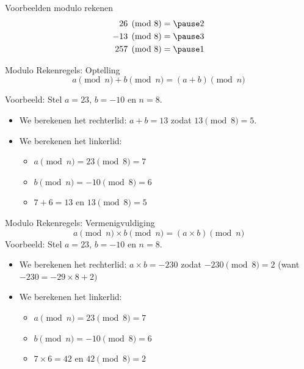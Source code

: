 \documentclass{beamer}
\begin{document}
\begin{frame}{Voorbeelden modulo rekenen}
	\begin{eqnarray*}
			26  \pmod{8} &= \pause 2 \\
			-13 \pmod{8} &= \pause 3 \\
			257 \pmod{8} &= \pause 1 
	\end{eqnarray*}
\end{frame}


\begin{frame}{Modulo Rekenregels: Optelling}
	\[ a \pmod{n} + b \pmod{n}  =  (a + b)  \pmod{n}\]
	
	\vspace{0.5cm}
	Voorbeeld: Stel $a = 23$, $b = -10$ en $n = 8$.
	\begin{itemize}
	\pause \item We berekenen het rechterlid: $a + b = 13$ zodat $13 \pmod 8 = 5$.
	\pause \item We berekenen het linkerlid:
	 \begin{itemize}
	   \pause\item $a \pmod n = 23 \pmod{8} = 7$
	   \pause\item $b \pmod n = -10\pmod{8} = 6$
	   \pause \item $7 + 6 = 13$ en $13 \pmod{8} = 5$ 
	\end{itemize}
	\end{itemize}
	
	
	 
\end{frame}

\begin{frame}{Modulo Rekenregels: Vermenigvuldiging}
	\[ a \pmod{n} \times b \pmod{n}  =  (a \times b)  \pmod{n}\]
		\vspace{0.5cm}
	Voorbeeld: Stel $a = 23$, $b = -10$ en $n = 8$.
	\begin{itemize}
		\pause \item We berekenen het rechterlid: $a \times b = -230$ zodat $-230 \pmod 8 = 2$ (want $-230 = - 29 \times 8 + 2)$
		\pause \item We berekenen het linkerlid:
		\begin{itemize}
			\pause\item $a \pmod n = 23 \pmod{8} = 7$
			\pause\item $b \pmod n = -10\pmod{8} = 6$
			\pause \item $7 \times 6 = 42$ en $42 \pmod{8} = 2$ 
		\end{itemize}
	\end{itemize}
\end{frame}
\end{document}
